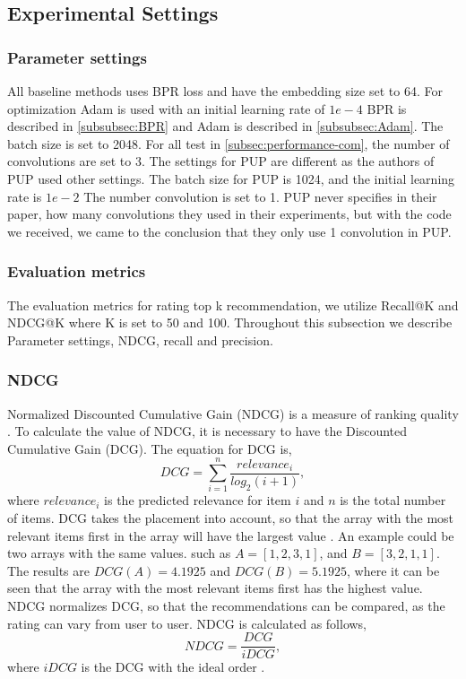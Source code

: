 \subsection{Experimental Settings}
\subsubsection{Parameter settings}
All baseline methods uses BPR loss and have the embedding size set to 64.
For optimization Adam is used with an initial learning rate of $1e-4$
BPR is described in \autoref{subsubsec:BPR} and Adam is described in \autoref{subsubsec:Adam}.
The batch size is set to 2048.
For all test in \autoref{subsec:performance-com}, the number of convolutions are set to 3.
The settings for PUP are different as the authors of PUP used other settings.
The batch size for PUP is 1024, and the initial learning rate is $1e-2$
The number convolution is set to 1.
PUP never specifies in their paper, how many convolutions they used in their experiments, but with the code we received, we came to the conclusion that they only use 1 convolution in PUP.

\subsubsection{Evaluation metrics}
The evaluation metrics for rating top k recommendation, we utilize Recall@K and NDCG@K where K is set to 50 and 100.
Throughout this subsection we describe Parameter settings, NDCG, recall and precision.

\subsubsection{NDCG}
Normalized Discounted Cumulative Gain (NDCG) is a measure of ranking quality \cite{NDCG-evaluation}.
To calculate the value of NDCG, it is necessary to have the Discounted Cumulative Gain (DCG).
The equation for DCG is,
\begin{equation}
    DCG = \sum_{i=1}^{n} \frac{relevance_i}{log_2(i+1)},
\end{equation}
where $relevance_i$ is the predicted relevance for item $i$ and $n$ is the total number of items.
DCG takes the placement into account, so that the array with the most relevant items first in the array will have the largest value \cite{NDCG-evaluation,Handbook}.
An example could be two arrays with the same values. such as $A = [1, 2, 3, 1]$, and $B = [3, 2, 1, 1]$. The results are $DCG(A) = 4.1925$ and $DCG(B) = 5.1925$, where it can be seen that the array with the most relevant items first has the highest value.
NDCG normalizes DCG, so that the recommendations can be compared, as the rating can vary from user to user.
NDCG is calculated as follows,
\begin{equation}
    NDCG = \frac{DCG}{iDCG},
\end{equation}
where $iDCG$ is the DCG with the ideal order \cite{NDCG-evaluation,Handbook}.

